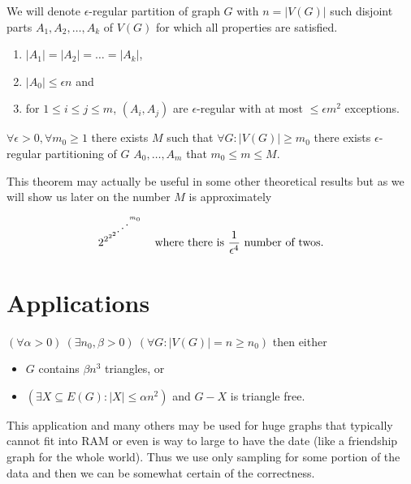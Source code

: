 \begin{defn}
	We will denote $\epsilon$-regular partition of graph $G$ with $n = |V(G)|$ such disjoint parts $A_{1}, A_{2}, \dots, A_{k}$ of $V(G)$ for which all properties are satisfied.
	
	\begin{enumerate}
		\item $|A_1| = |A_2| = \dots = |A_k|$,
		\item $|A_0| \leq \epsilon n$ and
		\item for $1 \leq i \leq j \leq m$, $(A_i, A_j)$ are $\epsilon$-regular with at most $\leq \epsilon m^2$ exceptions.
	\end{enumerate}
\end{defn}

\begin{thm}
	$\forall \epsilon > 0, \forall m_0 \geq 1$ there exists $M$ such that $\forall G : |V(G)| \geq m_0$ there exists $\epsilon$-regular partitioning of $G$ $A_0, \dots, A_m$ that $m_0 \leq m \leq M$.
\end{thm}

This theorem may actually be useful in some other theoretical results but as we will show us later on the number $M$ is approximately

$$
2^{2{^{2^{2^{\reflectbox{$\ddots$}^{m_0}}}}}} \quad \text{where there is } \frac{1}{\epsilon^4} \text{ number of twos.}
$$

\section{Applications}

\begin{lemma}
	$(\forall \alpha >0) \ (\exists n_0, \beta > 0) \ (\forall G : |V(G)| = n \geq n_0)$ then either
	
	\begin{itemize}
		\item $G$ contains $\beta n^3$ triangles, or
		\item $(\exists X \subseteq E(G): |X| \leq \alpha n^2)$ and $G-X$ is triangle free.
	\end{itemize}
\end{lemma}

This application and many others may be used for huge graphs that typically cannot fit into RAM or even is way to large to have the date (like a friendship graph for the whole world). Thus we use only sampling for some portion of the data and then we can be somewhat certain of the correctness.


